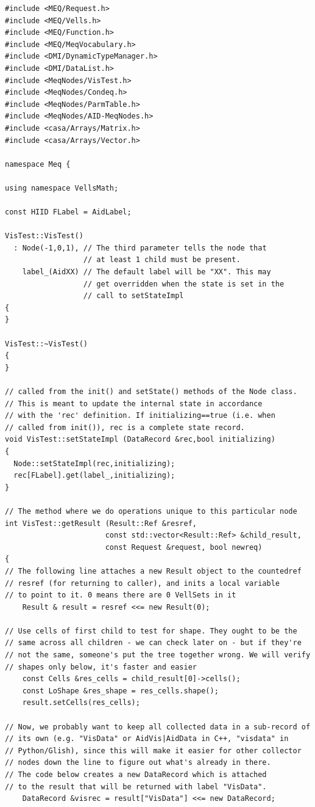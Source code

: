 \documentclass[10pt]{article}
\begin{document}
\begin{verbatim}
#include <MEQ/Request.h>
#include <MEQ/Vells.h>
#include <MEQ/Function.h>
#include <MEQ/MeqVocabulary.h>
#include <DMI/DynamicTypeManager.h>
#include <DMI/DataList.h>
#include <MeqNodes/VisTest.h>
#include <MeqNodes/Condeq.h>
#include <MeqNodes/ParmTable.h>
#include <MeqNodes/AID-MeqNodes.h>
#include <casa/Arrays/Matrix.h>
#include <casa/Arrays/Vector.h>

namespace Meq {

using namespace VellsMath;

const HIID FLabel = AidLabel;

VisTest::VisTest()
  : Node(-1,0,1), // The third parameter tells the node that
                  // at least 1 child must be present.
    label_(AidXX) // The default label will be "XX". This may
                  // get overridden when the state is set in the
                  // call to setStateImpl
{
}

VisTest::~VisTest()
{
}

// called from the init() and setState() methods of the Node class.
// This is meant to update the internal state in accordance 
// with the 'rec' definition. If initializing==true (i.e. when 
// called from init()), rec is a complete state record.
void VisTest::setStateImpl (DataRecord &rec,bool initializing)
{
  Node::setStateImpl(rec,initializing);
  rec[FLabel].get(label_,initializing);
}

// The method where we do operations unique to this particular node
int VisTest::getResult (Result::Ref &resref, 
                       const std::vector<Result::Ref> &child_result,
                       const Request &request, bool newreq)
{
// The following line attaches a new Result object to the countedref
// resref (for returning to caller), and inits a local variable 
// to point to it. 0 means there are 0 VellSets in it
	Result & result = resref <<= new Result(0);

// Use cells of first child to test for shape. They ought to be the 
// same across all children - we can check later on - but if they're 
// not the same, someone's put the tree together wrong. We will verify
// shapes only below, it's faster and easier
	const Cells &res_cells = child_result[0]->cells();
	const LoShape &res_shape = res_cells.shape();
	result.setCells(res_cells);

// Now, we probably want to keep all collected data in a sub-record of 
// its own (e.g. "VisData" or AidVis|AidData in C++, "visdata" in 
// Python/Glish), since this will make it easier for other collector 
// nodes down the line to figure out what's already in there.
// The code below creates a new DataRecord which is attached
// to the result that will be returned with label "VisData".
	DataRecord &visrec = result["VisData"] <<= new DataRecord;


\end{verbatim}
\end{document}
